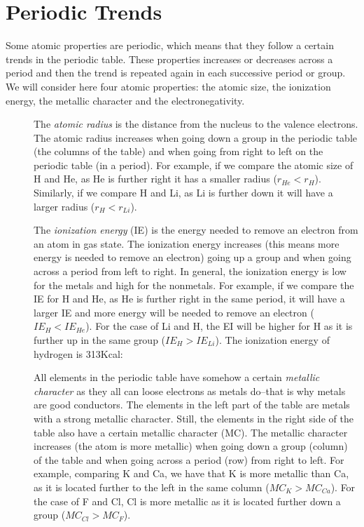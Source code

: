 \documentclass[main.tex]{subfiles}
\begin{document}
\section{Periodic Trends}
Some atomic properties are periodic, which means that they follow a certain trends in the periodic table. These properties increases or decreases across a period and then the trend is repeated again in each successive period or group. We will consider here four atomic properties: the atomic size, the ionization energy, the metallic character and the electronegativity.

\sloppy
\begin{description}
\item[] The \emph{atomic radius} is the distance from the nucleus to the valence electrons. The atomic radius increases when going down a group in the periodic table (the columns of the table) and when going from right to left on the periodic table (in a period). For example, if we compare the atomic size of H and He, as He is further right it has a smaller radius ($r_{He}<r_{H}$). Similarly, if we compare H and Li, as Li is further down it will have a larger radius ($r_{H}<r_{Li}$).

\item[] The \emph{ionization energy} (IE) is the energy needed to remove an electron from an atom in gas state. The ionization energy increases (this means more energy is needed to remove an electron) going up a group and when going across a period from left to right. In general, the ionization energy is low for the metals and high for the nonmetals. For example, if we compare the IE for H and He, as He is further right in the same period, it will have a larger IE and more energy will be needed to remove an electron ($IE_{H}<IE_{He}$). For the case of Li and H, the EI will be higher for H as it is further up in the same group ($IE_{H}>IE_{Li}$).
The ionization energy of hydrogen is  313Kcal:
\begin{center} \end{center}


\item[] 
All elements in the periodic table have somehow a certain \emph{metallic character} as they all can loose electrons as metals do--that is why metals are good conductors. The elements in the left part of the table are metals with a strong metallic character. Still, the elements in the right side of the table also have a certain metallic character (MC). The metallic character increases (the atom is more metallic) when going down a group (column) of the table and when going across a period (row) from right to left. For example, comparing K and Ca, we have that K is more metallic than Ca, as it is located further to the left in the same column ($MC_{K}>MC_{Ca}$). For the case of F and Cl, Cl is more metallic as it is located further down a group ($MC_{Cl}>MC_{F}$). 



\end{description}
\end{document}
